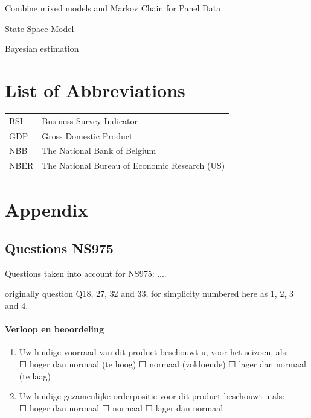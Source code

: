 \documentclass[12pt,a4paper,oneside]{book}
\begin{document}
Combine mixed models and Markov Chain for Panel Data \citep{de_haan-rietdijk_use_2017} 

State Space Model

Bayesian estimation \cite{bialowolski_bayesian_nodate}

\nocite{hlavac_stargazer:_2018}


 

\chapter*{List of Abbreviations}

\begin{tabular}{l l}
  BSI  & Business Survey Indicator \\
  GDP & Gross Domestic Product \\
  NBB & The National Bank of Belgium \\
  NBER & The National Bureau of Economic Research (US)
\end{tabular}

  
\begin{appendix}
  \listoffigures
  \listoftables
\end{appendix}


\chapter*{Appendix}

\section{Questions NS975}
Questions taken into account for NS975:
....

originally question Q18, 27, 32 and 33, for simplicity numbered here as 1, 2, 3 and 4.

\subsubsection*{Verloop en beoordeling}
\begin{enumerate}
    \item Uw huidige voorraad van dit product beschouwt u, voor het seizoen, als: \\
	$\Square$	hoger dan normaal (te hoog)	$\Square$	normaal (voldoende)	$\Square$ lager dan normaal (te laag)
	
    \item Uw huidige gezamenlijke orderpositie voor dit product beschouwt u als: \\
	$\Square$ hoger dan normaal $\Square$ normaal $\Square$ lager dan normaal
\end{enumerate}
\end{document}
